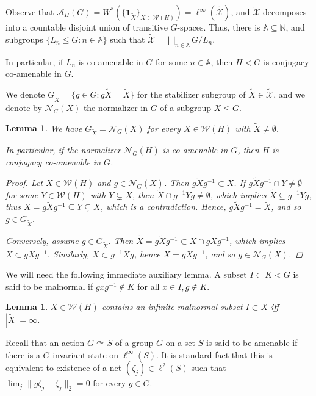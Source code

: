 \documentclass[11pt]{amsart}
\newtheorem{lem}[thm]{Lemma}
\theoremstyle{definition}
\newcommand{\bA}{{\mathbb A}}
\newcommand{\bN}{{\mathbb N}}
\newcommand{\cX}{{\mathcal X}}
\newcommand{\act}{\curvearrowright}
\begin{document}
Observe that $\mathcal{A}_H(G)= W^*(\{\mathbf{1}_{\widetilde{X}}\}_{X\in \mathcal{W}(H)}) = \ell^\infty(\widetilde{\cX})$, and $\widetilde{\cX}$ decomposes into a countable disjoint union of transitive $G$-spaces. Thus, there is $\bA\subseteq \bN$, and subgroups $\{L_n\le G :n\in \bA\}$ such that $\widetilde{\cX} = \bigsqcup_{n\in \bA} G/L_n$. 

In particular, if $L_n$ is co-amenable in $G$ for some $n\in\bA$, then $H<G$ is conjugacy co-amenable in $G$.

We denote $G_{\widetilde{X}} = \{g\in G : g\widetilde{X} = \widetilde{X}\}$ for the stabilizer subgroup of $\widetilde{X}\in \widetilde{\cX}$, and we denote by $\mathcal{N}_G(X)$ the normalizer in $G$ of a subgroup $X\le G$.

\begin{lem}\label{lem:stab}
We have $G_{\widetilde{X}} = \mathcal{N}_G(X)$ for every $X\in \mathcal{W}(H)$ with $\widetilde{X}\neq\emptyset$.

In particular, if the normalizer $\mathcal{N}_G(H)$ is co-amenable in $G$, then $H$ is conjugacy co-amenable in $G$.
\begin{proof}
Let $X\in \mathcal{W}(H)$ and $g\in \mathcal{N}_G(X)$. Then $g\widetilde{X}g^{-1} \subset X$. If $g\widetilde{X}g^{-1} \cap Y \neq \emptyset$ for some $Y\in \mathcal{W}(H)$ with $Y\subsetneq X$, then $\widetilde{X} \cap g^{-1}Y g \neq \emptyset$, which implies $\widetilde{X} \subseteq g^{-1}Y g$, thus $X= g\widetilde{X}g^{-1} \subseteq Y\subsetneq X$, which is a contradiction. Hence, $g\widetilde{X}g^{-1} =\widetilde{X}$, and so $g\in G_{\widetilde{X}}$.

Conversely, assume $g\in G_{\widetilde{X}}$. Then $\widetilde{X}=g\widetilde{X}g^{-1} \subset X\cap g{X}g^{-1}$, which implies $X \subset g{X}g^{-1}$. Similarly, $X \subset g^{-1}{X}g$, hence $X = g{X}g^{-1}$, and so $g\in \mathcal{N}_G(X)$.
\end{proof}
\end{lem} 




We will need the following immediate auxiliary lemma. A subset $I\subset K<G$ is said to be malnormal if $gxg^{-1}\notin K$ for all $x\in I, g\notin K$. 

\begin{lem}
    $X\in \mathcal{W}(H)$ contains an infinite malnormal subset $I\subset X$ iff $|\widetilde{X}|=\infty$. 
\end{lem}

Recall that an action $G\act S$ of a group $G$ on a set $S$ is said to be amenable if there is a $G$-invariant state on $\ell^\infty(S)$. It is standard fact that this is equivalent to existence of a net $(\zeta_j)\in \ell^2(S)$ such that $\lim_j\|g\zeta_j-\zeta_j\|_2 = 0$ for every $g\in G$.
\end{document}
